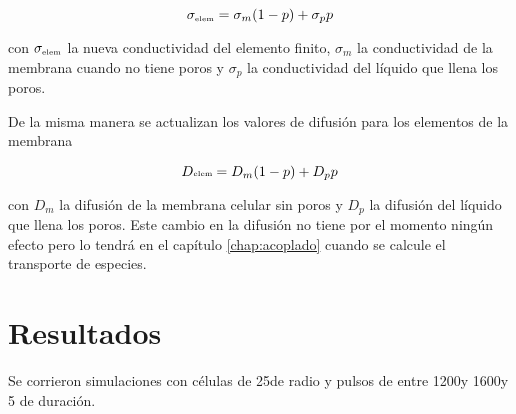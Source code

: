 \begin{equation} 
	\sigma_{\textrm{\tiny elem}} = \sigma_m (1 - p) + \sigma_p p
\end{equation} 

con $\sigma_{\textrm{\tiny elem}}$ la nueva conductividad del elemento finito, $\sigma_m$ la conductividad de la membrana cuando no tiene poros y $\sigma_p$ la conductividad del líquido que llena los poros.

De la misma manera se actualizan los valores de difusión para los elementos de la membrana 

\begin{equation} 
	D{\textrm{\tiny elem}} = D_m (1 - p) + D_p p
\end{equation} 

con $D_m$ la difusión de la membrana celular sin poros y $D_p$ la difusión del líquido que llena los poros. Este cambio en la difusión no tiene por el momento ningún efecto pero lo tendrá en el capítulo \ref{chap:acoplado} cuando se calcule el transporte de especies.

\section{Resultados}

Se corrieron simulaciones con células de 25\um de radio y pulsos de entre 1200\vcm y 1600\vcm y 5 \ms de duración.

%



